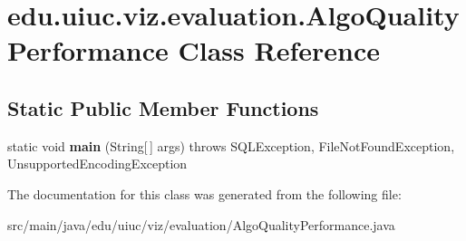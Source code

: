 \hypertarget{classedu_1_1uiuc_1_1viz_1_1evaluation_1_1_algo_quality_performance}{}\section{edu.\+uiuc.\+viz.\+evaluation.\+Algo\+Quality\+Performance Class Reference}
\label{classedu_1_1uiuc_1_1viz_1_1evaluation_1_1_algo_quality_performance}
\subsection*{Static Public Member Functions}
\begin{DoxyCompactItemize}
\item 
\mbox{\label{classedu_1_1uiuc_1_1viz_1_1evaluation_1_1_algo_quality_performance_ad2ce7fef2801c6e8ba4e3e47c7207abb}} 
static void {\bfseries main} (String\mbox{[}$\,$\mbox{]} args)  throws S\+Q\+L\+Exception, File\+Not\+Found\+Exception, Unsupported\+Encoding\+Exception  	
\end{DoxyCompactItemize}


The documentation for this class was generated from the following file\+:\begin{DoxyCompactItemize}
\item 
src/main/java/edu/uiuc/viz/evaluation/Algo\+Quality\+Performance.\+java\end{DoxyCompactItemize}
